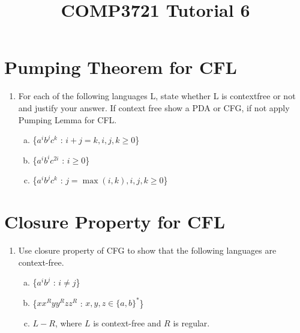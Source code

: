 \documentclass[a4paper]{article}
\date{}
\author{}
\title{COMP3721 Tutorial 6}
\theoremstyle{definition}
\numberwithin{equation}{subsection}
\begin{document}
\maketitle
\section{Pumping Theorem for CFL}
\begin{enumerate}[1.]
\item For each of the following languages L, state whether L is contextfree or not and justify your
answer. If context free show a PDA or CFG, if not apply Pumping Lemma for CFL.
    \begin{enumerate}[(a)]
        \item \{$a^ib^jc^k$ : $i + j = k, i,j,k \geq 0$\}
        \item \{$a^ib^ic^{2i}$ : $i \geq 0$\}
        \item \{$a^ib^jc^k$ : $ j = \max (i,k), i,j,k \geq 0$\}
    \end{enumerate}
    
\end{enumerate}  
\section{Closure Property for CFL}
\begin{enumerate}[1.]
	\item Use closure property of CFG to show that the following languages are context-free.
	\begin{enumerate}[(a)]
		\item \{$a^ib^j$ : $i \neq j$\}
		\item \{$xx^Ryy^Rzz^R$ : $x,y,z \in \{a,b\}^*$\}
		\item $L-R$, where $L$ is context-free and $R$ is regular.
	\end{enumerate}
\end{enumerate}
\end{document}

